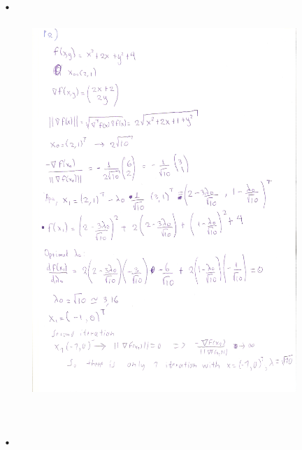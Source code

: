 \documentclass{article}
\begin{document}
\section{.}
\begin{figure}[htp]
    \centering
    \includegraphics[width=10cm]{photos/Scan_20201108.png}
    \caption{}
    \label{}
\end{figure}
\section{.}
\end{document}
